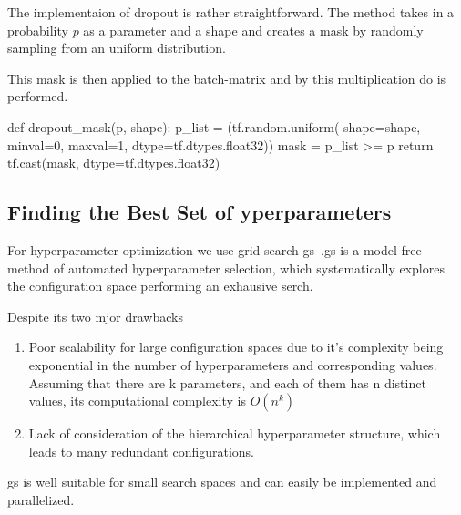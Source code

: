 The implementaion of dropout is rather straightforward. The method takes in a probability $p$ as a parameter and a shape and creates a mask by randomly sampling from an uniform distribution.

This mask is then applied to the batch-matrix and by this multiplication \ac{do} is performed.



def dropout_mask(p, shape):
p_list = (tf.random.uniform(
shape=shape, minval=0, maxval=1, dtype=tf.dtypes.float32))
mask = p_list >= p
return tf.cast(mask, dtype=tf.dtypes.float32)



\subsection{Finding the Best Set of yperparameters}
\label{sec:implement:setup: gridsearch}

For hyperparameter optimization we use grid search \ac{gs}~\cite{Lorenzo2017,Yang2020,Zoeller2021}.\Ac{gs} is a model-free method of automated hyperparameter selection, which systematically explores the configuration space performing an exhausive serch.

Despite its two mjor drawbacks

\begin{enumerate}
    \item Poor scalability for large configuration spaces due to it's complexity being exponential in the number of hyperparameters and corresponding values. Assuming that there are k parameters, and each of them has n distinct values, its computational complexity is $O(n^{k})$
    \item Lack of consideration of the hierarchical hyperparameter structure, which leads to many redundant configurations. %
\end{enumerate}

\ac{gs} is well suitable for small search spaces and can easily be implemented and parallelized.



